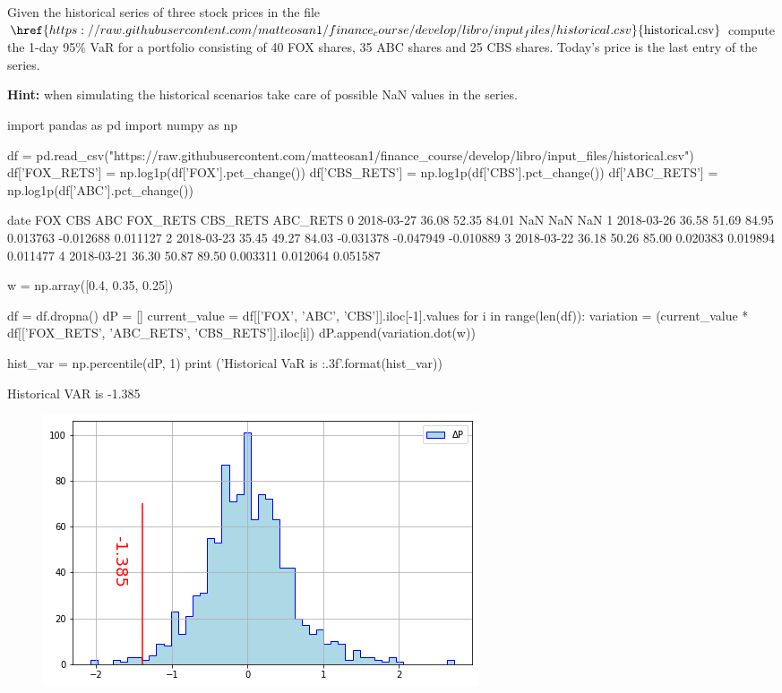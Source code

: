 \begin{question}
Given the historical series of three stock prices in the file
$\href{https://raw.githubusercontent.com/matteosan1/finance_course/develop/libro/input_files/historical.csv}{\textrm{historical.csv}}$
compute the 1-day 95\% VaR for a portfolio consisting of 40 FOX shares, 35 ABC shares and 25 CBS shares. 
Today's price is the last entry of the series.

\noindent\textbf{Hint:} when simulating the historical scenarios take care of possible NaN values
in the series. 
\end{question}

\cprotEnv\begin{solution}
\begin{ipython}
import pandas as pd
import numpy as np

df = pd.read_csv("https://raw.githubusercontent.com/matteosan1/finance_course/develop/libro/input_files/historical.csv")
df['FOX_RETS'] = np.log1p(df['FOX'].pct_change())
df['CBS_RETS'] = np.log1p(df['CBS'].pct_change())
df['ABC_RETS'] = np.log1p(df['ABC'].pct_change())
\end{ipython}
\begin{ioutput}
         date    FOX    CBS    ABC  FOX_RETS  CBS_RETS  ABC_RETS
0  2018-03-27  36.08  52.35  84.01       NaN       NaN       NaN
1  2018-03-26  36.58  51.69  84.95  0.013763 -0.012688  0.011127
2  2018-03-23  35.45  49.27  84.03 -0.031378 -0.047949 -0.010889
3  2018-03-22  36.18  50.26  85.00  0.020383  0.019894  0.011477
4  2018-03-21  36.30  50.87  89.50  0.003311  0.012064  0.051587
\end{ioutput}
\begin{ipython}
w = np.array([0.4, 0.35, 0.25])

df = df.dropna()
dP = []
current_value = df[['FOX', 'ABC', 'CBS']].iloc[-1].values
for i in range(len(df)):
    variation = (current_value * df[['FOX_RETS', 'ABC_RETS', 'CBS_RETS']].iloc[i])
    dP.append(variation.dot(w))

hist_var = np.percentile(dP, 1)
print ('Historical VaR is  {:.3f}'.format(hist_var))\end{ipython}
\begin{ioutput}
Historical VAR is -1.385
\end{ioutput}
\begin{figure}[htbp]
	\centering
\includegraphics[width=0.7\linewidth]{figures/hist_var_ex}
\end{figure}
\end{solution}

